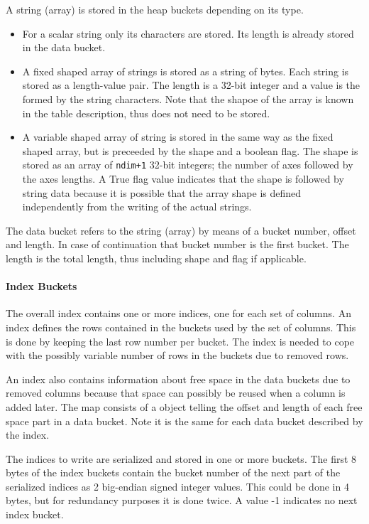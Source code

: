 A string (array) is stored in the heap buckets depending on its type.
\begin{itemize}
\item For a scalar string only its characters are stored. Its length
  is already stored in the data bucket.
\item A fixed shaped array of strings is stored as a string of
  bytes. Each string is stored as a length-value pair. The length is a
  32-bit integer and a value is the formed by the string characters.
Note that the shapoe of the array is known in the table description,
thus does not need to be stored.
\item A variable shaped array of string is stored in the same way as the fixed
  shaped array, but is preceeded by the shape and a boolean flag.
The shape is stored as an array of \texttt{ndim+1} 32-bit integers; the number
of axes followed by the axes lengths. A True flag value indicates that the shape
is followed by string data because it is possible that the array shape is
defined independently from the writing of the actual strings.
\end{itemize}
The data bucket refers to the string (array) by means of a bucket
  number, offset and length. In case of continuation that bucket number
  is the first bucket. The length is the total length, thus including
  shape and flag if applicable.

\paragraph{Index Buckets\\}
The overall index contains one or more indices, one for each set of
columns.
An index defines the rows contained in the buckets used by the set of columns. This is
done by keeping the last row number per bucket. The index is needed
to cope with the possibly variable number of rows in the buckets due to
removed rows.

An index also contains information about free space in the data
  buckets due to removed columns because that space can possibly be
  reused when a column is added later. The map consists of a
   object telling the offset and
  length of each free space part in a data bucket. Note it is the
  same for each data bucket described by the index. 

The indices to write are serialized and stored in one or more
buckets. The first 8 bytes of the index buckets contain the bucket
  number of the next part of the serialized indices as 2 big-endian
  signed integer values. This could be
  done in 4 bytes, but for redundancy purposes it is done twice.
A value -1 indicates no next index bucket.

